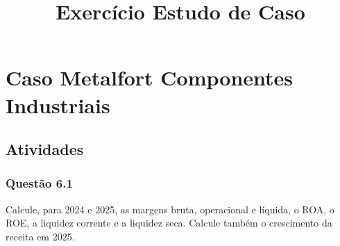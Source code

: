 
\title{Exercício Estudo de Caso}
\def\autor{Luiz Fernando Ferraz\\Oscar Sérgio Monteiro}
\def\disciplina{SC334 - Avaliação de Desempenho Organizacional, turma b}
\def\professor{Antônio César Pitela}


\chapter{Caso Metalfort Componentes Industriais}
\section{Atividades}
\subsection{Questão 6.1}
Calcule, para 2024 e 2025, as margens bruta, operacional e líquida, o ROA, o ROE, a liquidez corrente e a liquidez seca. Calcule também o crescimento da receita em 2025.\\
